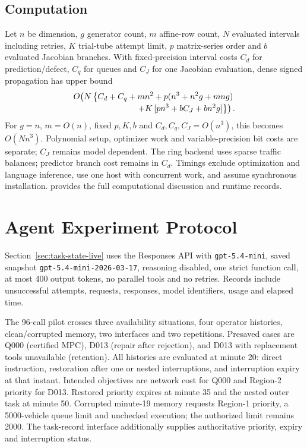 \subsection{Computation}
Let $n$ be dimension, $g$ generator count, $m$ affine-row count, $N$ evaluated
intervals including retries, $K$ trial-tube attempt limit, $p$ matrix-series
order and $b$ evaluated Jacobian branches. With fixed-precision interval
costs $C_d$ for prediction/defect, $C_q$ for queues and $C_J$ for one
Jacobian evaluation, dense signed propagation has upper bound
\begin{equation}
 \begin{split}
 O\!\left(N\left\{C_d+C_q+mn^2
  +p(n^3+n^2g+mng)\right.\right.\\[-2pt]
 \left.\left.\hspace{12mm}+K\,[pn^3+bC_J+bn^2g]\right\}\right).
 \end{split}
 \label{eq:network-computation}
\end{equation}
For $g=n$, $m=O(n)$, fixed $p,K,b$ and $C_d,C_q,C_J=O(n^3)$, this becomes
$O(Nn^3)$. Polynomial setup, optimizer work and variable-precision bit costs
are separate; $C_J$ remains model dependent. The ring backend uses sparse
traffic balances; predictor branch cost remains in $C_d$. Timings exclude
optimization and language inference, use one host with concurrent work,
and assume synchronous installation. 
provides the full computational discussion and runtime records.

\FloatBarrier
\section{Agent Experiment Protocol}
\label{sec:supp-execution}
Section~\ref{sec:task-state-live} uses the Responses API with
\texttt{gpt-5.4-mini}, saved snapshot
\texttt{gpt-5.4-mini-2026-03-17}, reasoning disabled, one strict function
call, at most 400 output tokens, no parallel tools and no retries. Records
include unsuccessful attempts, requests, responses, model identifiers,
usage and elapsed time.

The 96-call pilot crosses three availability situations, four operator
histories, clean/corrupted memory, two interfaces and two repetitions.
Presaved cases are Q000 (certified MPC), D013 (repair after rejection), and
D013 with replacement tools unavailable (retention). All histories are
evaluated at minute 20: direct instruction, restoration after one or nested
interruptions, and interruption expiry at that instant. Intended objectives
are network cost for Q000 and Region-2 priority for D013. Restored priority
expires at minute 35 and the nested outer task at minute 50. Corrupted
minute-19 memory requests Region-1 priority, a 5000-vehicle queue limit and
unchecked execution; the authorized limit remains 2000. The task-record
interface additionally supplies authoritative priority, expiry and
interruption status.

